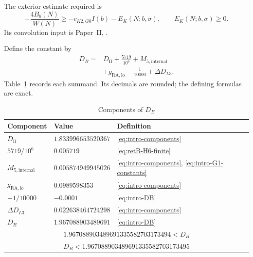 The exterior estimate required is
\begin{equation}\label{eq:intro-exterior}
 -\frac{4B_b(N)}{W(N)}\ge-c_{K2,G0}I(b)-E_K(N;b,\sigma),
 \qquad E_K(N;b,\sigma)\ge0.
\end{equation}
Its convolution input is Paper~II,
\cite[Lemma~5.1, (5.44)--(5.52)]{PaperII}.

Define the constant by
\begin{equation}\label{eq:intro-DB}
 \boxed{\begin{aligned}
 D_B={}&D_{\mathrm{II}}+\frac{5719}{10^6}
                  +M_{5,\mathrm{internal}}\\
       &+g_{\mathrm{RA,lo}}-\frac1{10000}+\Delta D_{L3}.
 \end{aligned}}
\end{equation}
Table~\ref{tab:intro-components} records each summand.
Its decimals are rounded; the defining formulas are exact.

\begin{table}[t]
\caption{Components of $D_B$}\label{tab:intro-components}
\small
\renewcommand{\arraystretch}{1.15}
\begin{tabular}{@{}lll@{}}
\hline
Component & Value & Definition\\
\hline
$D_{\mathrm{II}}$ & $1.833996653520367$ & \eqref{eq:intro-components}\\
$5719/10^6$ & $0.005719$ & \eqref{eq:retB-H6-finite}\\
$M_{5,\mathrm{internal}}$ & $0.005874949945026$ & \eqref{eq:intro-components}, \eqref{eq:intro-G1-constants}\\
$g_{\mathrm{RA,lo}}$ & $0.0989598353$ & \eqref{eq:intro-components}\\
$-1/10000$ & $-0.0001$ & \eqref{eq:intro-DB}\\
$\Delta D_{L3}$ & $0.022638464724298$ & \eqref{eq:intro-components}\\
\hline
$D_B$ & $1.967088903489691$ & \eqref{eq:intro-DB}\\
\multicolumn{3}{c}{$1.967088903489691335582703173494<D_B$}\\
\multicolumn{3}{c}{$D_B<1.967088903489691335582703173495$}\\
\hline
\end{tabular}
\end{table}

